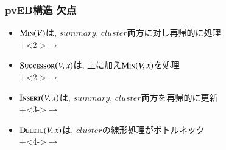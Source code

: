 \documentclass[beamer,dvipdfmx,12pt]{standalone}
\begin{document}
\begin{frame}\frametitle{pvEB構造 欠点}
    \begin{itemize}
        \item $\mathrm{\text{M\textsc{in}}}(V)$は, $summary$, $cluster$両方に対し再帰的に処理\\
        \onslide+<2->{\hspace{2em}$\to$\\}
        \item $\mathrm{\text{S\textsc{uccessor}}}(V,x)$は, 上に加え$\mathrm{\text{M\textsc{in}}}(V,x)$を処理\\
        \onslide+<2->{\hspace{2em}$\to$\\}
        \item $\mathrm{\text{I\textsc{nsert}}}(V,x)$は, $summary$, $cluster$両方を再帰的に更新\\
        \onslide+<3->{\hspace{2em}$\to$\\}
        \item $\mathrm{\text{D\textsc{elete}}}(V,x)$は, $cluster$の線形処理がボトルネック\\
        \onslide+<4->{\hspace{2em}$\to$\\}
    \end{itemize}
\end{frame}
\end{document}
